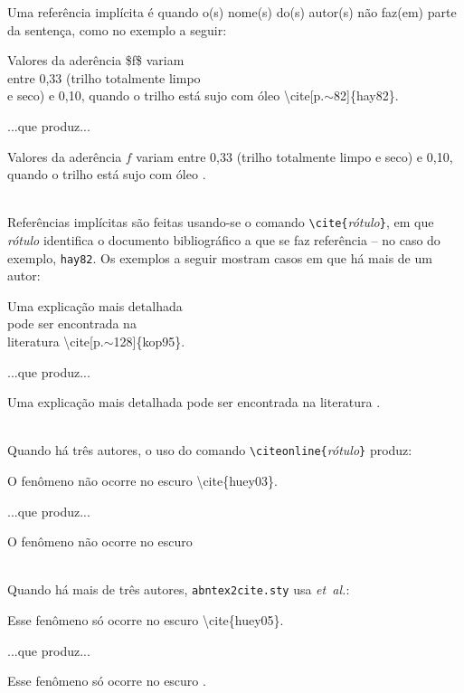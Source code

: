 Uma referência implícita é quando o(s) nome(s) do(s) autor(s) não 
faz(em) parte da sentença, como no exemplo a seguir:\\[6pt]
	{\parbox[t]{6.7cm}{%
	\ttfamily\footnotesize\sloppy
	Valores da aderência \$f\$ variam \\ entre 0,33
	(trilho totalmente limpo \\ e seco) e 0,10, 
	quando o trilho está sujo com óleo 
	\textbackslash{}cite[p.$\sim$82]\{hay82\}.}}
\hspace{\fill} ...que produz...\hspace{\fill}
	{\parbox[t]{5.5cm}{%
	\footnotesize Valores da aderência $f$ variam entre 0,33
	(trilho totalmente limpo e seco) e 0,10, 
	quando o trilho está sujo com óleo 
	\cite[p.~82]{hay82}.}}\\[12pt]
	
Referências implícitas são feitas usando-se o comando 
\verb|\cite{|\emph{rótulo}\verb|}|, em que \emph{rótulo} identifica
o documento bibliográfico a que se faz referência -- no caso do
exemplo, \texttt{hay82}. Os exemplos a seguir mostram casos em que
há mais de um autor:\\[6pt]
	{\parbox[t]{6cm}{%
	\ttfamily\footnotesize
	Uma explicação mais detalhada\\ 
	pode ser encontrada na\\ literatura 
	\textbackslash{}cite[p.$\sim$128]\{kop95\}.}}
\hspace{1em} ...que produz...\hspace{1em}
	{\parbox[t]{6cm}{%
	\footnotesize Uma explicação mais detalhada pode
	ser encontrada na literatura  
	\cite[p.~128]{kop95}.}}\\[12pt]
Quando há três autores, o uso do comando 
\verb|\citeonline{|\emph{rótulo}\verb|}| produz:\\[6pt]
	{\parbox[t]{5.5cm}{%
	\ttfamily\footnotesize
	O fenômeno não ocorre no escuro
	\textbackslash{}cite\{huey03\}.}}
\hspace{1em} ...que produz...\hspace{1em}
	{\parbox[t]{6.5cm}{%
	\footnotesize
	O fenômeno não ocorre no escuro 
	\cite{huey03}}}\\[12pt]
Quando há mais de três autores, \texttt{abntex2cite.sty} usa 
\emph{et~al.}:\\[6pt]
	{\parbox[t]{5.5cm}{%
	\ttfamily\footnotesize
	Esse fenômeno só ocorre no escuro
	\textbackslash{}cite\{huey05\}.}}
\hspace{1em} ...que produz...\hspace{1em}
	{\parbox[t]{6.5cm}{%
	\footnotesize 
	Esse fenômeno só ocorre no escuro
	\cite{huey05}.}}\\[12pt]


